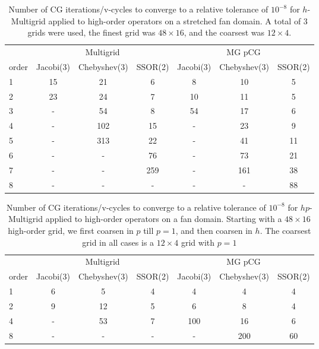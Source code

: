 \begin{table}
  \caption{\label{tab:homg} Number of CG iterations/v-cycles to converge to a relative tolerance of $10^{-8}$ for $h$-Multigrid applied to high-order operators on a stretched fan domain. A total of 3 grids were used, the finest grid was $48\times 16$, and the coarsest was $12\times 4$.}
		\centering
    \begin{tabular}{|l|c|c|c|c|c|c|} 
	    \hline
				    & \multicolumn{3}{c|}{Multigrid} & \multicolumn{3}{c|}{MG pCG}\\  \cline{2-7}
			order & \scriptsize Jacobi(3)  &\scriptsize  Chebyshev(3)  &\scriptsize SSOR(2) &\scriptsize Jacobi(3)  &\scriptsize  Chebyshev(3)  &\scriptsize SSOR(2) \\
			\hline
      
      1 & 15 & 21 & 6 & 8 & 10 & 5 \\ 
			2 & 23 & 24 & 7 & 10 & 11 & 5 \\
      3 & -  & 54 & 8 & 54 & 17 & 6 \\
      4 & -  & 102 & 15 & - & 23 & 9 \\
      5 & -  & 313 & 22 & - & 41 & 11 \\
      6 & - & - & 76 & - & 73 & 21 \\ 
      7 & - & - & 259 & - & 161 & 38 \\
      8 & - & - & - & - & - & 88 \\
      \hline
	  \end{tabular}
\end{table}


\begin{table}
  \caption{\label{tab:hpmg} Number of CG iterations/v-cycles to converge to a relative tolerance of $10^{-8}$ for $hp$-Multigrid applied to high-order operators on a fan domain. Starting with a $48\times 16$ high-order grid, we first coarsen in $p$ till $p=1$, and then coarsen in $h$. The coarsest grid in all cases is a $12\times 4$ grid with $p=1$}
		\centering
		\begin{tabular}{|l|c|c|c|c|c|c|} 
	    \hline
				    & \multicolumn{3}{c|}{Multigrid} & \multicolumn{3}{c|}{MG pCG}\\  \cline{2-7}
			order & \scriptsize Jacobi(3)  &\scriptsize  Chebyshev(3)  &\scriptsize SSOR(2) &\scriptsize Jacobi(3)  &\scriptsize  Chebyshev(3)  &\scriptsize SSOR(2) \\
			\hline
				1 & 6  &  5 &  4 & 4 & 4 & 4 \\ 
        2 & 9 & 12 & 5 & 6 & 8 & 4 \\
				4 & - & 53 & 7 & 100 & 16 & 6 \\
        8 & - & -  & - & - & 200 & 60 \\
			\hline
	  \end{tabular}
\end{table}


